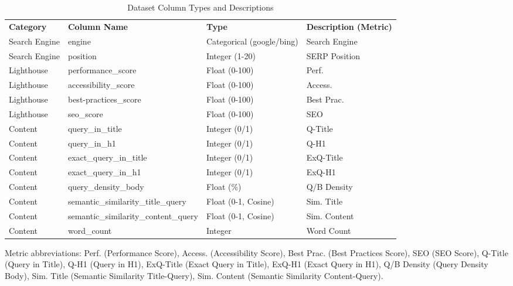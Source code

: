 \documentclass[a4paper,fleqn]{cas-sc}
\newcommand{\sbf}[1]{\scriptsize\textbf{#1}}
\newcommand{\dmidrule}{\specialrule{0.8pt}{0pt}{0.4pt}\specialrule{0.8pt}{0pt}{0pt}}
\begin{document}
\begin{table}[htbp!]
\centering
\begin{threeparttable}
\caption{Dataset Column Types and Descriptions}
\label{tab:dataset_columns_types}
\small
\setlength{\tabcolsep}{3pt}
\renewcommand{\arraystretch}{1}
\begin{tabular*}{\textwidth}{l@{\extracolsep{\fill}}lll}
\toprule
\sbf{Category} & \sbf{Column Name} & \sbf{Type} & \sbf{Description (Metric)} \\
\dmidrule
Search Engine & engine & Categorical (google/bing) & Search Engine \\
Search Engine & position & Integer (1-20) & SERP Position \\
\midrule
Lighthouse & performance\_score & Float (0-100) & Perf. \\
Lighthouse & accessibility\_score & Float (0-100) & Access. \\
Lighthouse & best-practices\_score & Float (0-100) & Best Prac. \\
Lighthouse & seo\_score & Float (0-100) & SEO \\
\midrule
Content & query\_in\_title & Integer (0/1) & Q-Title \\
Content & query\_in\_h1 & Integer (0/1) & Q-H1 \\
Content & exact\_query\_in\_title & Integer (0/1) & ExQ-Title \\
Content & exact\_query\_in\_h1 & Integer (0/1) & ExQ-H1 \\
Content & query\_density\_body & Float (\%) & Q/B Density \\
Content & semantic\_similarity\_title\_query & Float (0-1, Cosine) & Sim. Title \\
Content & semantic\_similarity\_content\_query & Float (0-1, Cosine) & Sim. Content \\
Content & word\_count & Integer & Word Count \\
\bottomrule
\end{tabular*}
\begin{tablenotes}[flushleft]
\scriptsize
\item Metric abbreviations: Perf. (Performance Score), Access. (Accessibility Score), Best Prac. (Best Practices Score), SEO (SEO Score), Q-Title (Query in Title), Q-H1 (Query in H1), ExQ-Title (Exact Query in Title), ExQ-H1 (Exact Query in H1), Q/B Density (Query Density Body), Sim. Title (Semantic Similarity Title-Query), Sim. Content (Semantic Similarity Content-Query).
\end{tablenotes}
\end{threeparttable}
\end{table}
\end{document}
